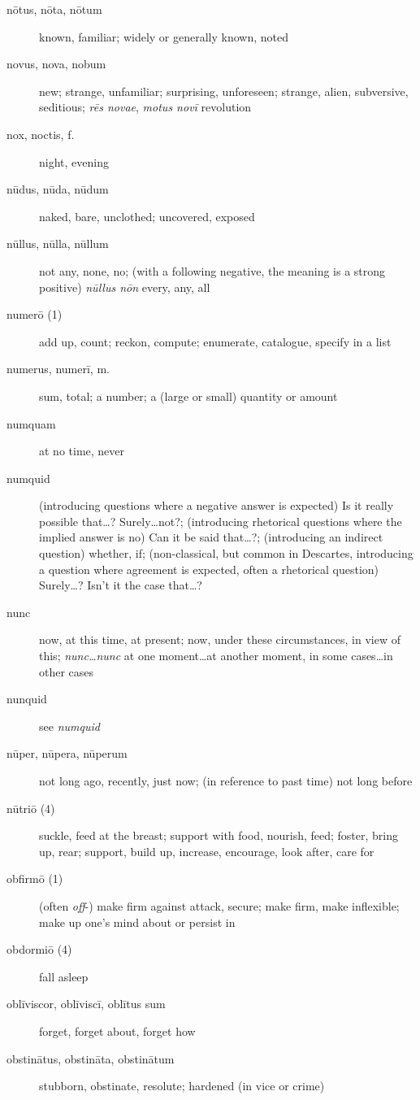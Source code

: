 \begin{description}
    \item[nōtus, nōta, nōtum] known, familiar; widely or generally known, noted
    \item[novus, nova, nobum] new; strange, unfamiliar; surprising, unforeseen; strange, alien, subversive, seditious; \textit{rēs novae}, \textit{motus novī} revolution
    \item[nox, noctis, f.] night, evening
    \item[nūdus, nūda, nūdum] naked, bare, unclothed; uncovered, exposed
    \item[nūllus, nūlla, nūllum] not any, none, no; (with a following negative, the meaning is a strong positive) \textit{nūllus nōn} every, any, all
    \item[numerō (1)] add up, count; reckon, compute; enumerate, catalogue, specify in a list
    \item[numerus, numerī, m.] sum, total; a number; a (large or small) quantity or amount
    \item[numquam] at no time, never
    \item[numquid] (introducing questions where a negative answer is expected) Is it really possible that\dots ? Surely\dots not?; (introducing rhetorical questions where the implied answer is no) Can it be said that\dots ?; (introducing an indirect question) whether, if; (non-classical, but common in Descartes, introducing a question where agreement is expected, often a rhetorical question) Surely\dots ? Isn't it the case that\dots ?
    \item[nunc] now, at this time, at present; now, under these circumstances, in view of this; \textit{nunc\dots nunc} at one moment\dots at another moment, in some cases\dots in other cases
    \item[nunquid] see \textit{numquid}
    \item[nūper, nūpera, nūperum] not long ago, recently, just now; (in reference to past time) not long before
    \item[nūtriō (4)] suckle, feed at the breast; support with food, nourish, feed; foster, bring up, rear; support, build up, increase, encourage, look after, care for
    \item[obfirmō (1)] (often \textit{off}-) make firm against attack, secure; make firm, make inflexible; make up one's mind about or persist in
    \item[obdormiō (4)] fall asleep
    \item[oblīviscor, oblīviscī, oblītus sum] forget, forget about, forget how
    \item[obstinātus, obstināta, obstinātum] stubborn, obstinate, resolute; hardened (in vice or crime)

\end{description}
